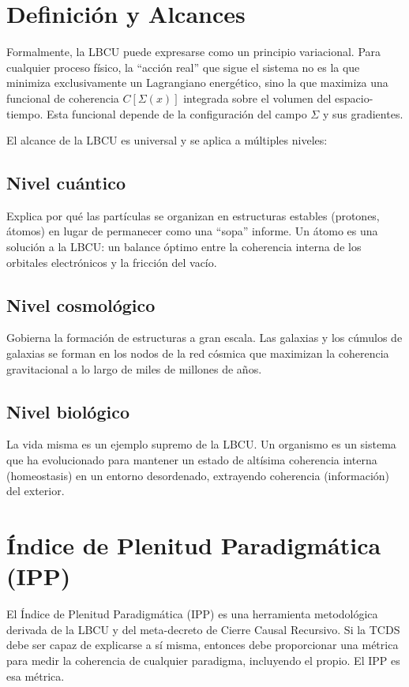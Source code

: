 \documentclass[12pt,openright]{book}
\newcommand{\IPP}{IPP}
\begin{document}
\section{Definición y Alcances}
Formalmente, la LBCU puede expresarse como un principio variacional. Para cualquier proceso físico, la ``acción real'' que sigue el sistema no es la que minimiza exclusivamente un Lagrangiano energético, sino la que maximiza una funcional de coherencia \(C[\Sigma(x)]\) integrada sobre el volumen del espacio-tiempo. Esta funcional depende de la configuración del campo \(\Sigma\) y sus gradientes.

El alcance de la LBCU es universal y se aplica a múltiples niveles:

\subsection*{Nivel cuántico}
Explica por qué las partículas se organizan en estructuras estables (protones, átomos) en lugar de permanecer como una ``sopa'' informe. Un átomo es una solución a la LBCU: un balance óptimo entre la coherencia interna de los orbitales electrónicos y la fricción del vacío.

\subsection*{Nivel cosmológico}
Gobierna la formación de estructuras a gran escala. Las galaxias y los cúmulos de galaxias se forman en los nodos de la red cósmica que maximizan la coherencia gravitacional a lo largo de miles de millones de años.

\subsection*{Nivel biológico}
La vida misma es un ejemplo supremo de la LBCU. Un organismo es un sistema que ha evolucionado para mantener un estado de altísima coherencia interna (homeostasis) en un entorno desordenado, extrayendo coherencia (información) del exterior.

\section{Índice de Plenitud Paradigmática (IPP)}
El Índice de Plenitud Paradigmática (\IPP) es una herramienta metodológica derivada de la LBCU y del meta-decreto de Cierre Causal Recursivo. Si la TCDS debe ser capaz de explicarse a sí misma, entonces debe proporcionar una métrica para medir la coherencia de cualquier paradigma, incluyendo el propio. El \IPP{} es esa métrica.
\end{document}
